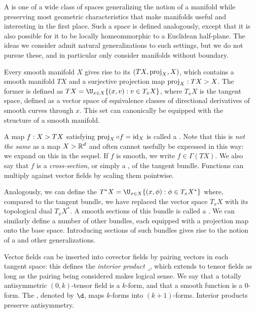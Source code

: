 \documentclass[11pt]{book}
\begin{document}
A  is one of a wide class of spaces generalizing the notion of a manifold while preserving most geometric characteristics that make manifolds useful and interesting in the first place.
Such a space is defined analogously, except that it is also possible for it to be locally homeommorphic to a Euclidean half-plane.
The ideas we consider admit natural generalizations to such settings, but we do not pursue these, and in particular only consider manifolds without boundary.

Every smooth manifold $X$ gives rise to its  $(TX,\operatorname{proj}_X,X)$, which contains a smooth manifold $TX$ and a surjective projection map $\operatorname{proj}_X : TX \-> X$.
The former is defined as $TX = \U_{x\in X} \{(x,v) : v \in T_x X\}$, where $T_x X$ is the tangent space, defined as a vector space of equivalence classes of directional derivatives of smooth curves through $x$.
This set can canonically be equipped with the structure of a smooth manifold.

A map $f : X \-> TX$ satisfying $\operatorname{proj}_X \circ f = \operatorname{id}_X$ is called a .
Note that this is \emph{not the same} as a map $X \-> \mathbb{R}^d$ and often cannot usefully be expressed in this way: we expand on this in the sequel.
If $f$ is smooth, we write $f \in \Gamma(TX)$.
We also say that $f$ is a \emph{cross-section}, or simply a , of the tangent bundle.
Functions can multiply against vector fields by scaling them pointwise.

Analogously, we can define the  $T^* X = \U_{x\in X} \{(x,\phi) : \phi \in T_x X^*\}$ where, compared to the tangent bundle, we have replaced the vector space $T_x X$ with its topological dual $T_x X^*$.
A smooth sections of this bundle is called a .
We can similarly define a number of other bundles, each equipped with a projection map onto the base space.
Introducing sections of such bundles gives rise to the notion of a  and other generalizations.

Vector fields can be inserted into covector fields by pairing vectors in each tangent space: this defines the \emph{interior product} $\mathbin{\lrcorner}$, which extends to tensor fields as long as the pairing being considered makes logical sense.
We say that a totally antisymmetric $(0,k)$-tensor field is a $k$-form, and that a smooth function is a $0$-form.
The , denoted by $\d$, maps $k$-forms into $(k+1)$-forms.
Interior products preserve antisymmetry.
\end{document}
